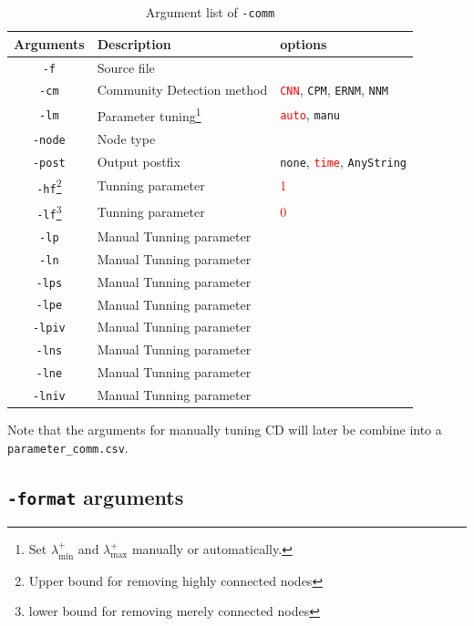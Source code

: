 \documentclass[11pt,a4paper]{article}
\theoremstyle{definition}
\theoremstyle{definition}
\numberwithin{equation}{section}
\begin{document}
		\begin{table}[!h]
		\centering
		\begin{tabular}{cll}
			\hline
			Arguments & Description & options\\
			\hline
			\texttt{-f}& Source file &  \\
			\hline
			\texttt{-cm}& Community Detection method & \textcolor{red}{\texttt{CNN}}, \texttt{CPM}, \texttt{ERNM}, \texttt{NNM}\\
			\hline
			\texttt{-lm}& Parameter tuning\footnote{Set $\lambda^+_{\min}$ and $\lambda^+_{\max}$ manually or automatically.}& \textcolor{red}{\texttt{auto}}, \texttt{manu}\\
			\hline
			\texttt{-node}& Node type& \\
			\hline
			\texttt{-post}& Output postfix & \texttt{none}, \textcolor{red}{\texttt{time}}, \texttt{AnyString}\\
			\hline
			\texttt{-hf}\footnote{Upper bound for removing highly connected nodes}& Tunning parameter&\textcolor{red}{1}\\
			\hline
			\texttt{-lf}\footnote{lower bound for removing merely connected nodes}& Tunning parameter&\textcolor{red}{0}\\
			\hline
			\texttt{-lp}& Manual Tunning parameter&\\
			\hline
			\texttt{-ln}& Manual Tunning parameter&\\
			\hline
			\texttt{-lps}& Manual Tunning parameter& \\
			\hline
			\texttt{-lpe}& Manual Tunning parameter&\\
			\hline
			\texttt{-lpiv}& Manual Tunning parameter&\\
			\hline
			\texttt{-lns}& Manual Tunning parameter&\\
			\hline
			\texttt{-lne}& Manual Tunning parameter&\\
			\hline
			\texttt{-lniv}& Manual Tunning parameter&\\
			\hline
		\end{tabular}
		\caption{Argument list of \texttt{-comm}}
		\label{tab:commlist}
	\end{table}

	Note that the arguments for manually tuning CD will later be combine into a \texttt{parameter\_comm.csv}. 
	
	\subsection{\texttt{-format} arguments}
	
\end{document}

